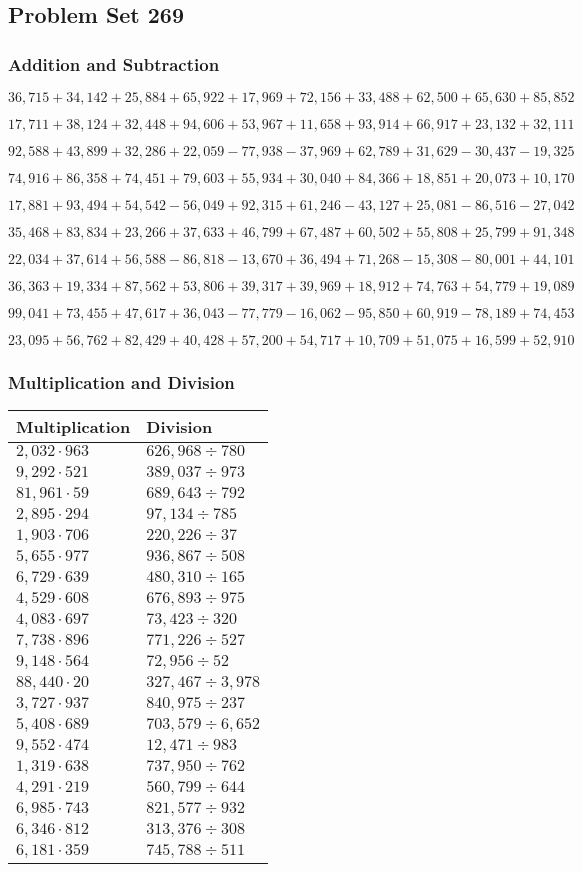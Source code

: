 \hypertarget{problem-set-269}{%
\subsection{Problem Set 269}\label{problem-set-269}}

\hypertarget{addition-and-subtraction}{%
\subsubsection{Addition and
Subtraction}\label{addition-and-subtraction}}

\(36,715+34,142+25,884+65,922+17,969+72,156+33,488+62,500+65,630+85,852\)

\(17,711+38,124+32,448+94,606+53,967+11,658+93,914+66,917+23,132+32,111\)

\(92,588+43,899+32,286+22,059-77,938-37,969+62,789+31,629-30,437-19,325\)

\(74,916+86,358+74,451+79,603+55,934+30,040+84,366+18,851+20,073+10,170\)

\(17,881+93,494+54,542-56,049+92,315+61,246-43,127+25,081-86,516-27,042\)

\(35,468+83,834+23,266+37,633+46,799+67,487+60,502+55,808+25,799+91,348\)

\(22,034+37,614+56,588-86,818-13,670+36,494+71,268-15,308-80,001+44,101\)

\(36,363+19,334+87,562+53,806+39,317+39,969+18,912+74,763+54,779+19,089\)

\(99,041+73,455+47,617+36,043-77,779-16,062-95,850+60,919-78,189+74,453\)

\(23,095+56,762+82,429+40,428+57,200+54,717+10,709+51,075+16,599+52,910\)

\hypertarget{multiplication-and-division}{%
\subsubsection{Multiplication and
Division}\label{multiplication-and-division}}

\begin{longtable}[]{@{}ll@{}}
\toprule
Multiplication & Division\tabularnewline
\midrule
\endhead
\(2,032\cdot963\) & \(626,968÷780\)\tabularnewline
\(9,292\cdot521\) & \(389,037÷973\)\tabularnewline
\(81,961\cdot59\) & \(689,643÷792\)\tabularnewline
\(2,895\cdot294\) & \(97,134÷785\)\tabularnewline
\(1,903\cdot706\) & \(220,226÷37\)\tabularnewline
\(5,655\cdot977\) & \(936,867÷508\)\tabularnewline
\(6,729\cdot639\) & \(480,310÷165\)\tabularnewline
\(4,529\cdot608\) & \(676,893÷975\)\tabularnewline
\(4,083\cdot697\) & \(73,423÷320\)\tabularnewline
\(7,738\cdot896\) & \(771,226÷527\)\tabularnewline
\(9,148\cdot564\) & \(72,956÷52\)\tabularnewline
\(88,440\cdot20\) & \(327,467÷3,978\)\tabularnewline
\(3,727\cdot937\) & \(840,975÷237\)\tabularnewline
\(5,408\cdot689\) & \(703,579÷6,652\)\tabularnewline
\(9,552\cdot474\) & \(12,471÷983\)\tabularnewline
\(1,319\cdot638\) & \(737,950÷762\)\tabularnewline
\(4,291\cdot219\) & \(560,799÷644\)\tabularnewline
\(6,985\cdot743\) & \(821,577÷932\)\tabularnewline
\(6,346\cdot812\) & \(313,376÷308\)\tabularnewline
\(6,181\cdot359\) & \(745,788÷511\)\tabularnewline
\bottomrule
\end{longtable}
